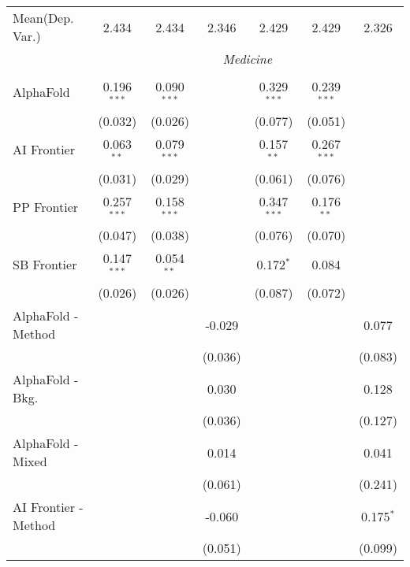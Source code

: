 \begin{tabular}{lcccccc}
Mean(Dep. Var.) & 2.434 & 2.434 & 2.346 & 2.429 & 2.429 & 2.326 \\
 & \multicolumn{6}{c}{\textit{Medicine}} \\ \\
   AlphaFold            & 0.196$^{***}$ & 0.090$^{***}$ &                & 0.329$^{***}$ & 0.239$^{***}$ &   \\   
                        & (0.032)       & (0.026)       &                & (0.077)       & (0.051)       &   \\   
   AI Frontier          & 0.063$^{**}$  & 0.079$^{***}$ &                & 0.157$^{**}$  & 0.267$^{***}$ &   \\   
                        & (0.031)       & (0.029)       &                & (0.061)       & (0.076)       &   \\   
   PP Frontier          & 0.257$^{***}$ & 0.158$^{***}$ &                & 0.347$^{***}$ & 0.176$^{**}$  &   \\   
                        & (0.047)       & (0.038)       &                & (0.076)       & (0.070)       &   \\   
   SB Frontier          & 0.147$^{***}$ & 0.054$^{**}$  &                & 0.172$^{*}$   & 0.084         &   \\   
                        & (0.026)       & (0.026)       &                & (0.087)       & (0.072)       &   \\   
   AlphaFold - Method   &               &               & -0.029         &               &               & 0.077\\   
                        &               &               & (0.036)        &               &               & (0.083)\\   
   AlphaFold - Bkg.     &               &               & 0.030          &               &               & 0.128\\   
                        &               &               & (0.036)        &               &               & (0.127)\\   
   AlphaFold - Mixed    &               &               & 0.014          &               &               & 0.041\\   
                        &               &               & (0.061)        &               &               & (0.241)\\   
   AI Frontier - Method &               &               & -0.060         &               &               & 0.175$^{*}$\\   
                        &               &               & (0.051)        &               &               & (0.099)\\   

\end{tabular}
